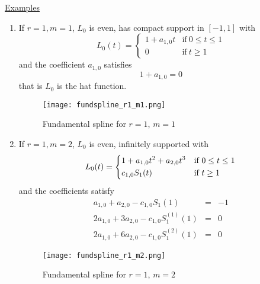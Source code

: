 \underline{Examples}
\begin{enumerate}
  \item If $r=1, m=1$, $L_0$ is even, has compact support in $[-1,1]$ with \begin{equation}
      L_0(t) = \begin{cases} 1 + a_{1,0} t & \text{if} \ 0 \leq t \leq 1 \\
	0 & \text{if} \ t \geq 1
      \end{cases}
    \end{equation}
    and the coefficient $a_{1,0}$ satisfies
    \begin{equation}
     1 + a_{1,0} = 0
    \end{equation}
    that is $L_0$ is the hat function.
    \begin{figure}[!h]
      \centering
      \texttt{[image: fundspline\_r1\_m1.png]}
      \caption{Fundamental spline for $r=1$, $m=1$}
    \end{figure}
    
  \item If $r=1, m=2$, $L_0$ is even, infinitely supported with
    \begin{equation*}
      L_0(t) =
      \begin{dcases}
	1 + a_{1,0} t^2 + a_{2,0}t^3 & \text{if} \ 0 \leq t \leq 1  \\
	c_{1,0}S_1(t) & \text{if} \ t \geq 1  \\
      \end{dcases}
    \end{equation*}
    and the coefficients satisfy
    \begin{equation}
      \begin{array}{rcl}
       a_{1,0} + a_{2,0} - c_{1,0} S_1(1) & = & -1  \\
       2a_{1,0} + 3a_{2,0} - c_{1,0} S_1^{(1)}(1) & = & 0 \\
       2a_{1,0} + 6a_{2,0} - c_{1,0} S_1^{(2)}(1) & = & 0
      \end{array}
    \end{equation}
    \begin{figure}[!h]
      \centering
      \texttt{[image: fundspline\_r1\_m2.png]}
      \caption{Fundamental spline for $r=1$, $m=2$}
    \end{figure}


\end{enumerate}
